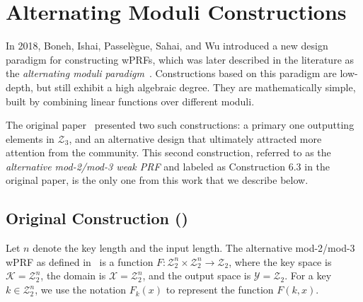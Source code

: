 \documentclass[journal=tosc,submission]{iacrtrans}
\theoremstyle{theorem}
\newcommand\Z{\mathcal{Z}}
\newcommand\lp[1]{\textcolor{blue!80}{\textbf{Léo:} #1}}
\newcommand\gc[1]{\textcolor{olive!80}{\textbf{Geoffroy:} #1}}
\begin{document}

\section{Alternating Moduli Constructions}
\label{sec:bipsw}


In 2018, Boneh, Ishai, Passelègue, Sahai, and Wu introduced a new design paradigm for constructing wPRFs, which was later described in the literature as the \emph{alternating moduli paradigm}~\cite{TCC:BIPSW18}. Constructions based on this paradigm are low-depth, but still exhibit a high algebraic degree. They are mathematically simple, built by combining linear functions over different moduli.

The original paper~\cite{TCC:BIPSW18} presented two such constructions: a primary one outputting elements in $\Z_3$, and an alternative design that ultimately attracted more attention from the community. This second construction, referred to as the \emph{alternative mod-2/mod-3 weak PRF} and labeled as Construction 6.3 in the original paper, is the only one from this work that we describe below. 


\subsection{Original Construction (\cite{TCC:BIPSW18})}
\label{sec:bipsw_original}
Let $n$ denote the key length and the input length. 
The alternative mod-2/mod-3 wPRF as defined in~\cite{TCC:BIPSW18} is a function $F : \Z_2^n \times \Z_2^n \to \Z_2$, where the key space is $\mathcal{K} = \Z_2^n$, the domain is $\mathcal{X} = \Z_2^n$, and the output space is $\mathcal{Y} = \Z_2$. For a key $k \in \Z_2^n$, we use the notation $F_k(x)$ to represent the function $F(k, x)$.
\end{document}
